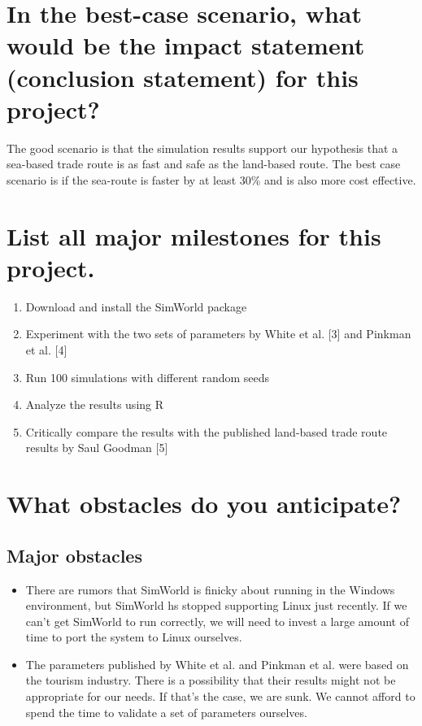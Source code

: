 \documentclass{proc}
\begin{document}
\section{In the best-case scenario, what would be the impact statement (conclusion statement) for this project?  } 

The good scenario is that the simulation results support our hypothesis that a sea-based trade route is as fast and safe as the land-based route.  The best case scenario is if the sea-route is faster by at least 30\% and is also more cost effective.


\section{List all major milestones for this project.}

\begin{enumerate}
  \item Download and install the SimWorld package
  \item Experiment with the two sets of parameters by White et al. [3] and Pinkman et al. [4]
  \item Run 100 simulations with different random seeds
  \item Analyze the results using R
  \item Critically compare the results with the published land-based trade route results by Saul Goodman [5]
\end{enumerate}

\section{What obstacles do you anticipate?}

\subsection{Major obstacles} 

\begin{itemize}
  \item There are rumors that SimWorld is finicky about running in the Windows environment, but SimWorld hs stopped supporting Linux just recently.  If we can't get SimWorld to run correctly, we will need to invest a large amount of time to port the system to Linux ourselves.
  \item The parameters published by White et al. and Pinkman et al. were based on the tourism industry. There is a possibility that their results might not be appropriate for our needs.  If that's the case, we are sunk.  We cannot afford to spend the time to validate a set of parameters ourselves.
\end{itemize}
\end{document}
